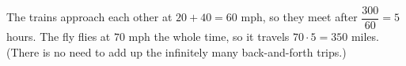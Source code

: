 The trains approach each other at $20+40=60$ mph, so they meet after $\dfrac{300}{60}=5$ hours. The fly flies at $70$ mph the whole time, so it travels $70\cdot5=\boxed{350}$ miles. (There is no need to add up the infinitely many back-and-forth trips.)
